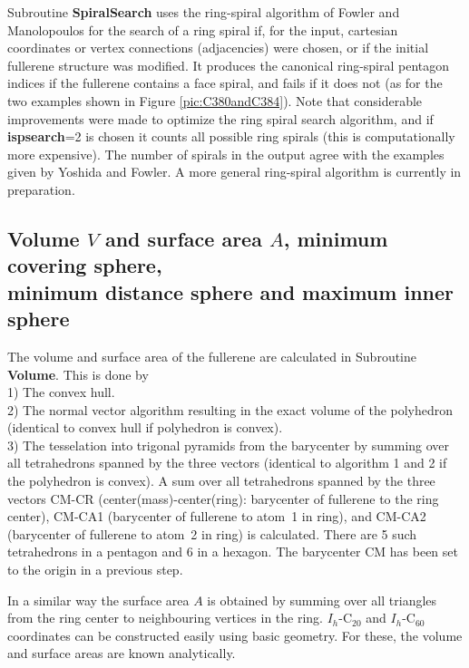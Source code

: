 \documentclass[article,a4paper,twoside]{memoir}
\newcommand{\C}[1]{\ensuremath{\mathrm{C}_{#1}}}
\newcommand{\funname}[1]{{\color{blue}\textbf{#1}}}
\newcommand{\paramname}[1]{{\color{green}\textbf{#1}}}
\begin{document}
Subroutine \funname{SpiralSearch} uses the ring-spiral algorithm of Fowler and Manolopoulos \cite{Atlas}
for the search of a ring spiral if, for the input, cartesian coordinates or vertex connections (adjacencies) were chosen, or if the
initial fullerene structure was modified. It produces the canonical ring-spiral pentagon indices
if the fullerene contains a face spiral, and fails if it does not (as for the two examples shown in 
Figure \ref{pic:C380andC384}). Note that considerable improvements were made to optimize the ring spiral search algorithm, and if 
\paramname{ispsearch}=2 is chosen it counts all possible ring spirals (this is computationally more expensive). 
The number of spirals in the output agree with the examples given by Yoshida and Fowler.\cite{Yoshida97a} 
A more general ring-spiral algorithm is currently in preparation.

\subsection{Volume $V$ and surface area $A$, minimum covering sphere, \\ minimum distance sphere and maximum inner sphere}
The volume and surface area of the fullerene are calculated in Subroutine \funname{Volume}. This is done by\\
1) The convex hull.\\
2) The normal vector algorithm resulting in the exact volume of the polyhedron (identical to convex hull if polyhedron is convex).\\
3) The tesselation into trigonal pyramids from the barycenter by summing over all tetrahedrons spanned
by the three vectors (identical to algorithm 1 and 2 if the polyhedron is convex).  A sum over all
tetrahedrons spanned by the three vectors CM-CR (center(mass)-center(ring): barycenter of fullerene to the ring center),
CM-CA1 (barycenter of fullerene to atom~1 in ring), and CM-CA2 (barycenter of fullerene  to atom~2 in ring) is calculated.
There are 5 such tetrahedrons in a pentagon and 6 in a hexagon.  The barycenter CM has been set to the origin in a previous step.

In a similar way the surface area $A$ is obtained by summing over all triangles from the ring center to
neighbouring vertices in the ring. $I_h$-\C{20} and $I_h$-\C{60} coordinates can be constructed easily
using basic geometry. For these, the volume and surface areas are known analytically.
\end{document}
